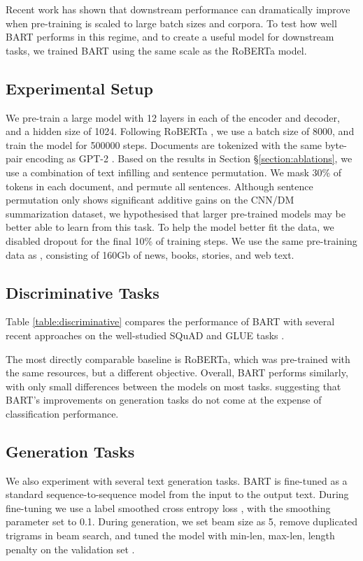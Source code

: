 \documentclass{article} %
\newcommand{\omer}[1]{{\color{blue} [Omer: #1]}}
\begin{document}
Recent work has shown that downstream performance can dramatically improve when pre-training is scaled to large batch sizes \citep{xlnet,roberta} and corpora. To test how well BART performs in this regime, and to create a useful model for downstream tasks, we trained BART using the same scale as the RoBERTa model.

\subsection{Experimental Setup}
We pre-train a large model with 12 layers in each of the encoder and decoder, and a hidden size of 1024. Following RoBERTa \cite{roberta}, we use a batch size of 8000, and train the model for 500000 steps. Documents are tokenized with the same byte-pair encoding as GPT-2 \cite{gpt2}. Based on the results in Section \S\ref{section:ablations}, we use a combination of text infilling and sentence permutation. We mask 30\% of tokens in each document, and permute all sentences. 
Although sentence permutation only shows significant additive gains on the CNN/DM summarization dataset, we hypothesised that larger pre-trained models may be better able to learn from this task.
To help the model better fit the data, we disabled dropout for the final 10\% of training steps. 
We use the same pre-training data as \citet{roberta}, consisting of 160Gb of news, books, stories, and web text.

\subsection{Discriminative Tasks}
Table \ref{table:discriminative} compares the performance of BART with several recent approaches on the well-studied SQuAD and GLUE tasks \citep{warstadt2018neural,socher2013recursive,dolan2005automatically,agirre2007semantic,williams2018broad,dagan2006pascal,levesque2011winograd}. 

The most directly comparable baseline is RoBERTa, which was pre-trained with the same resources, but a different objective. Overall, BART performs similarly, with only small differences between the models on most tasks. suggesting that BART's improvements on generation tasks do not come at the expense of classification performance.

\subsection{Generation Tasks}
We also experiment with several text generation tasks. BART is fine-tuned as a standard sequence-to-sequence model from the input to the output text.
During fine-tuning we use a label smoothed cross entropy loss \citep{labelsmoothing}, with the smoothing parameter set to 0.1. During generation, we set beam size as 5, remove duplicated trigrams in beam search, %
and tuned the model with min-len, max-len, length penalty on the validation set \cite{summarization_hacks}.
\end{document}
